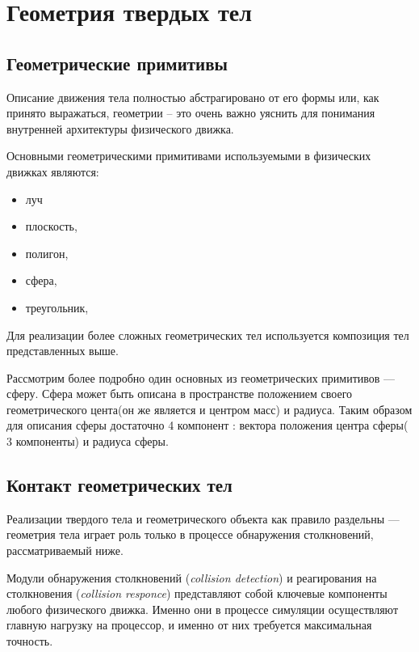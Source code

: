 \chapter{Геометрия твердых тел}
\section{Геометрические примитивы}
Описание движения тела полностью абстрагировано от его формы
или, как принято выражаться, геометрии – это очень важно
уяснить для понимания внутренней архитектуры физического
движка.

Основными геометрическими примитивами используемыми в физических движках являются:
\begin{itemize}
 \item  луч 
 \item  плоскость,
 \item  полигон,
 \item  сфера,
 \item  треугольник,
 \end{itemize}
Для реализации более сложных геометрических тел используется композиция тел представленных выше.

Рассмотрим более подробно один основных из геометрических примитивов --- сферу.
Сфера может быть описана в пространстве положением своего геометрического цента(он же является и центром масс)
и радиуса. Таким образом для описания сферы достаточно 4 компонент : вектора положения центра сферы( 3 компоненты) и радиуса сферы.


\section{Контакт геометрических тел}
Реализации твердого тела и геометрического объекта как правило раздельны --- геометрия тела играет роль только в
процессе обнаружения столкновений, рассматриваемый ниже.

Модули обнаружения столкновений (\textit{collision detection}) и реагирования на столкновения (\textit{collision responce}) представляют 
собой ключевые компоненты любого физического движка. Именно они в процессе симуляции осуществляют главную нагрузку на
процессор, и именно от них требуется максимальная точность.

